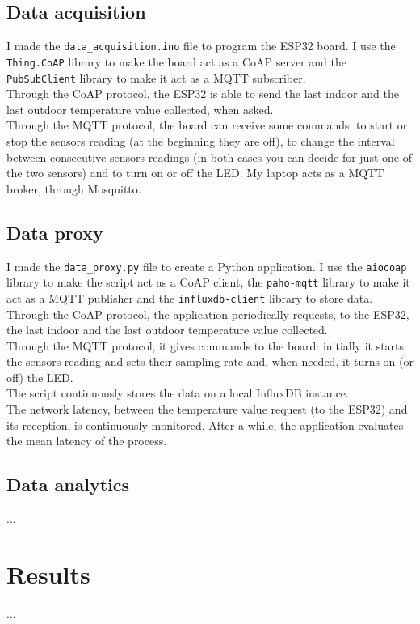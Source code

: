 \documentclass[conference]{IEEEtran}
\begin{document}
\subsection{Data acquisition}
I made the \texttt{data\_acquisition.ino} file to program the ESP32 board. I use the \texttt{Thing.CoAP} library to make the board act as a CoAP server and the \texttt{PubSubClient} library to make it act as a MQTT subscriber.\\
Through the CoAP protocol, the ESP32 is able to send the last indoor and the last outdoor temperature value collected, when asked.\\
Through the MQTT protocol, the board can receive some commands: to start or stop the sensors reading (at the beginning they are off), to change the interval between consecutive sensors readings (in both cases you can decide for just one of the two sensors) and to turn on or off the LED. My laptop acts as a MQTT broker, through Mosquitto.

\subsection{Data proxy}
I made the \texttt{data\_proxy.py} file to create a Python application. I use the \texttt{aiocoap} library to make the script act as a CoAP client, the \texttt{paho-mqtt} library to make it act as a MQTT publisher and the \texttt{influxdb-client} library to store data.\\
Through the CoAP protocol, the application periodically requests, to the ESP32, the last indoor and the last outdoor temperature value collected.\\
Through the MQTT protocol, it gives commands to the board: initially it starts the sensors reading and sets their sampling rate and, when needed, it turns on (or off) the LED.\\
The script continuously stores the data on a local InfluxDB instance.\\
The network latency, between the temperature value request (to the ESP32) and its reception, is continuously monitored. After a while, the application evaluates the mean latency of the process.

\subsection{Data analytics}
...


\section{Results}
...

\end{document}
